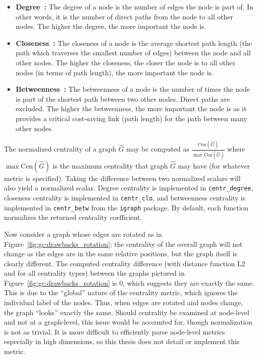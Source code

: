 \tablespacing
\begin{itemize}
	\item \textbf{Degree~\cite{igraph}:} 
	The degree of a node is the number of edges the node 
	is part of. In other words, it is the number of direct paths from the node 
	to all other nodes. The higher the degree, the more important the node 
	is.
	\item \textbf{Closeness~\cite{igraph}:} 
	The closeness of a node is the average 
	shortest path length (the path which traverses the smallest number of 
	edges) between the node and all other nodes. The higher the closeness, 
	the closer the node is to all other nodes (in terms of path length), the 
	more important the node is.
	\item \textbf{Betweenness~\cite{igraph}:} 
	The betweenness of a node is the number of 
	times the node is part of the shortest path between two other nodes. Direct 
	paths are excluded. The higher the betweenness, the more important the node 
	is as it provides a critical cost-saving link (path length) for the path 
	between many other nodes. 
\end{itemize}
\bodyspacing

The normalized centrality of a graph $\hat{G}$ may be computed as 	
$\frac{\text{Cen}(\hat{G})}{\max \text{Cen}(\hat{G})}$ where 
$\max \text{Cen}(\hat{G})$ is the 
maximum centrality that graph $\hat{G}$ may have (for whatever metric is 
specified). Taking the difference between two normalized scalars will also 
yield a normalized scalar.
Degree centrality is implemented in \texttt{centr\_degree}, 
closeness centrality is implemented in \texttt{centr\_clo}, and betweenness 
centrality is implemented in \texttt{centr\_betw} from the \texttt{igraph} 
package. By default, each function normalizes the returned centrality 
coefficient.

Now consider a graph whose edges are rotated as in 
Figure~\ref{fig:gc:drawbacks_rotation}; the centrality of the overall graph 
will not change as the edges are in the same relative positions, but the graph 
itself is clearly different. The computed centrality difference (with distance 
function L2 and for all centrality types) between the graphs pictured in 
Figure~\ref{fig:gc:drawbacks_rotation} is 0, which suggests they are exactly 
the same. This is due to the ``global'' nature of the centrality metric, which 
ignores the individual label of the nodes. Thus, when edges are rotated and 
nodes change, the graph ``looks'' exactly the same.
Should centrality be examined at node-level and not at a graph-level, 
this issue would be accounted for, though normalization is not as trivial. It 
is more difficult to efficiently parse node-level metrics 
especially in high dimensions, so this thesis does not detail or implement this 
metric.

